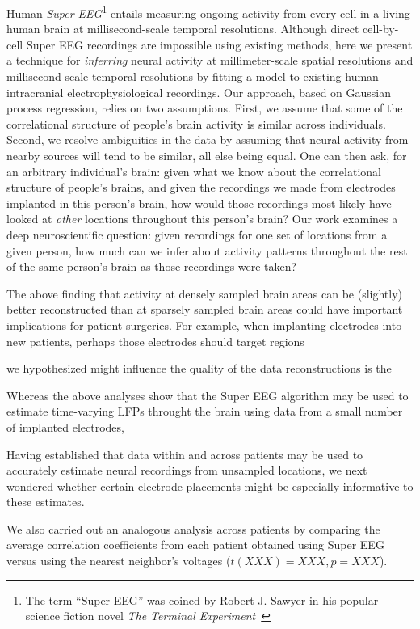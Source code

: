 Human \textit{Super EEG}\footnote{The term ``Super EEG'' was
coined by Robert J. Sawyer in his popular science fiction novel
\textit{The Terminal Experiment}~\cite{Sawy95}} entails
measuring ongoing activity from every cell in a living human brain
at millisecond-scale temporal resolutions.  Although direct
cell-by-cell Super EEG recordings are impossible using existing
methods, here we present a technique for \textit{inferring} neural
activity at millimeter-scale spatial resolutions and millisecond-scale temporal resolutions by fitting a model to existing human intracranial electrophysiological recordings.  Our approach, based
on Gaussian process regression, relies on two assumptions.  First,
we assume that some of the correlational structure of people's
brain activity is similar across individuals.  Second, we resolve
ambiguities in the data by assuming that neural activity from
nearby sources will tend to be similar, all else being equal.  One
can then ask, for an arbitrary individual's brain: given what we
know about the correlational structure of \textother people's brains,
and given the recordings we made from electrodes implanted in this
person's brain, how would those recordings most likely have looked
at \textit{other} locations throughout this person's brain?  Our work examines a deep neuroscientific question: given recordings for one set of locations from a given person, how much can we infer about activity patterns throughout the rest of the same person's brain as those recordings were taken?

The above finding that activity at densely sampled brain areas can be
(slightly) better reconstructed than at sparsely sampled brain areas
could have important implications for patient surgeries.  For example,
when implanting electrodes into new patients, perhaps those electrodes
should target regions

we hypothesized might influence the quality of the
data reconstructions is the

Whereas the above analyses show that the Super EEG algorithm may be
used to estimate time-varying LFPs throught the brain using data from a small
number of implanted electrodes,

Having established that data within and across patients may be used to
accurately estimate neural recordings from unsampled locations, we
next wondered whether certain electrode placements might be especially
informative to these estimates.

We also carried out an analogous analysis
across patients by comparing the average correlation coefficients from
each patient obtained using Super EEG versus using the nearest
neighbor's voltages ($t(XXX) = XXX, p = XXX$).

